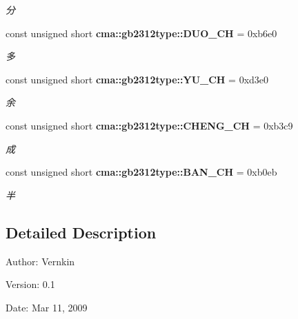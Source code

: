 \begin{CompactItemize}
\begin{CompactList}\small\item\em 分 \item\end{CompactList}\item 
const unsigned short {\bf cma::gb2312type::DUO\_\-CH} = 0xb6e0\label{namespacecma_1_1gb2312type_72389d3fac67d40d030ddd29122066f0}

\begin{CompactList}\small\item\em 多 \item\end{CompactList}\item 
const unsigned short {\bf cma::gb2312type::YU\_\-CH} = 0xd3e0\label{namespacecma_1_1gb2312type_cbe5cc72fe68a17ca2b6b3d6d0123e44}

\begin{CompactList}\small\item\em 余 \item\end{CompactList}\item 
const unsigned short {\bf cma::gb2312type::CHENG\_\-CH} = 0xb3c9\label{namespacecma_1_1gb2312type_59704f9b146ddd85cdea099786e71762}

\begin{CompactList}\small\item\em 成 \item\end{CompactList}\item 
const unsigned short {\bf cma::gb2312type::BAN\_\-CH} = 0xb0eb\label{namespacecma_1_1gb2312type_1e107f05eafdd7317a1560c2a220be37}

\begin{CompactList}\small\item\em 半 \item\end{CompactList}\end{CompactItemize}


\subsection{Detailed Description}
\begin{Desc}
\item[Author:]Vernkin \end{Desc}
\begin{Desc}
\item[Version:]0.1 \end{Desc}
\begin{Desc}
\item[Date:]Mar 11, 2009 \end{Desc}
